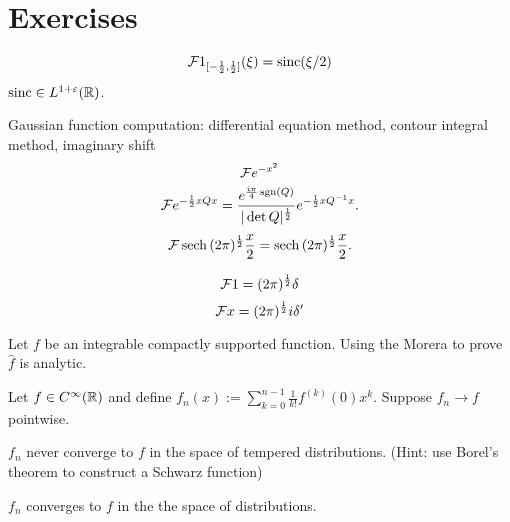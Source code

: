 \documentclass{../../large}
\begin{document}
\section*{Exercises}


\begin{prb}
\end{prb}
\begin{prb}
\end{prb}


\begin{prb}
\[\mathcal{F}1_{[-\frac12,\frac12]}(\xi)=\operatorname{sinc}(\xi/2)\]
$\operatorname{sinc}\in L^{1+\varepsilon}(\mathbb{R})$.
\end{prb}
\begin{prb}
Gaussian function computation:
differential equation method, contour integral method, imaginary shift
\[\mathcal{F} e^{-x^2}\]
\[\mathcal{F} e^{-\frac12xQx}=\frac{e^{\frac{i\pi}4\operatorname{sgn}(Q)}}{|\det Q|^{\frac12}}e^{-\frac12xQ^{-1}x}.\]
\[\mathcal{F}\operatorname{sech}{(2\pi)^{\frac12}\frac x2}=\operatorname{sech}{(2\pi)^{\frac12}\frac x2}.\]
\end{prb}
\begin{prb}
\[\mathcal{F}1=(2\pi)^{\frac12}\delta\]
\[\mathcal{F} x=(2\pi)^{\frac12}i\delta'\]
\end{prb}
\begin{prb}
\end{prb}
\begin{prb}
\end{prb}



\begin{prb}
Let $f$ be an integrable compactly supported function.
Using the Morera to prove $\hat f$ is analytic.

\end{prb}

\begin{prb}
Let $f\in C^\infty(\mathbb{R})$ and define $f_n(x):=\sum_{k=0}^{n-1}\frac1{k!}f^{(k)}(0)x^k$.
Suppose $f_n\to f$ pointwise.
\begin{parts}
\item $f_n$ never converge to $f$ in the space of tempered distributions. (Hint: use Borel's theorem to construct a Schwarz function)
\item $f_n$ converges to $f$ in the the space of distributions.
\end{parts}
\end{prb}
\end{document}
